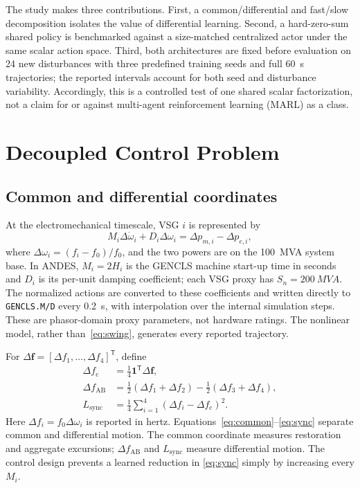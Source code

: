 \documentclass[conference,a4paper]{IEEEtran}
\begin{document}
The study makes three contributions. First, a common/differential and fast/slow
decomposition isolates the value of differential learning. Second, a
hard-zero-sum shared policy is benchmarked against a size-matched centralized
actor under the same scalar action space.
Third, both architectures are fixed before evaluation on 24 new disturbances
with three predefined training seeds and full \SI{60}{s} trajectories; the
reported intervals account for both seed and disturbance variability.
Accordingly, this is a controlled test of one shared scalar factorization, not
a claim for or against multi-agent reinforcement learning (MARL) as a class.

\section{Decoupled Control Problem}

\subsection{Common and differential coordinates}

At the electromechanical timescale, VSG \(i\) is represented by
\begin{equation}
 M_i\Delta\dot\omega_i+D_i\Delta\omega_i
 =\Delta p_{m,i}-\Delta p_{e,i},
\label{eq:swing}
\end{equation}
where \(\Delta\omega_i=(f_i-f_0)/f_0\), and the two powers are on the
\SI{100}{MVA} system base. In ANDES, \(M_i=2H_i\) is the GENCLS machine
start-up time in seconds and \(D_i\) is its per-unit damping coefficient; each
VSG proxy has \(S_n=\SI{200}{MVA}\). The normalized actions are converted to
these coefficients and written directly to \texttt{GENCLS.M/D} every
\SI{0.2}{s}, with interpolation over the internal simulation steps. These are
phasor-domain proxy parameters, not hardware ratings. The nonlinear model,
rather than~\eqref{eq:swing}, generates every reported trajectory.

For \(\Delta\mathbf f=[\Delta f_1,\ldots,\Delta f_4]^\mathsf T\), define
\begin{align}
 \Delta f_{\mathrm c}
 &=\tfrac14\mathbf1^\mathsf T\Delta\mathbf f, \label{eq:common}\\
 \Delta f_{\mathrm{AB}}
 &=\tfrac12(\Delta f_1+\Delta f_2)
  -\tfrac12(\Delta f_3+\Delta f_4), \label{eq:area}\\
 L_{\mathrm{sync}}
 &=\tfrac14\sum_{i=1}^{4}
   (\Delta f_i-\Delta f_{\mathrm c})^2 . \label{eq:sync}
\end{align}
Here \(\Delta f_i=f_0\Delta\omega_i\) is reported in hertz.
Equations~\eqref{eq:common}--\eqref{eq:sync} separate common and differential
motion. The common coordinate measures restoration and aggregate excursions;
\(\Delta f_{\mathrm{AB}}\) and \(L_{\mathrm{sync}}\) measure differential
motion. The control design prevents a learned reduction in
\eqref{eq:sync} simply by increasing every \(M_i\).
\end{document}
